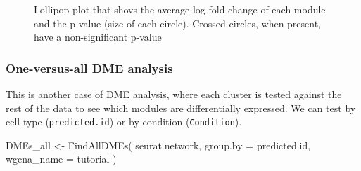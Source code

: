 \documentclass[
  letterpaper,
  DIV=11,
  numbers=noendperiod]{scrartcl}
\newenvironment{Shaded}{}{}
\newcommand{\AttributeTok}[1]{\textcolor[rgb]{0.49,0.56,0.16}{#1}}
\newcommand{\FunctionTok}[1]{\textcolor[rgb]{0.02,0.16,0.49}{#1}}
\newcommand{\NormalTok}[1]{#1}
\newcommand{\OtherTok}[1]{\textcolor[rgb]{0.00,0.44,0.13}{#1}}
\newcommand{\StringTok}[1]{\textcolor[rgb]{0.25,0.44,0.63}{#1}}
\begin{document}
\begin{figure}[H]


\caption{\label{fig-lol}Lollipop plot that shovs the average log-fold
change of each module and the p-value (size of each circle). Crossed
circles, when present, have a non-significant p-value}

\end{figure}%

\subsubsection{One-versus-all DME
analysis}\label{one-versus-all-dme-analysis}

This is another case of DME analysis, where each cluster is tested
against the rest of the data to see which modules are differentially
expressed. We can test by cell type (\texttt{predicted.id}) or by
condition (\texttt{Condition}).

\begin{Shaded}
\begin{Highlighting}[]
\NormalTok{DMEs\_all }\OtherTok{\textless{}{-}} \FunctionTok{FindAllDMEs}\NormalTok{(}
\NormalTok{  seurat.network,}
  \AttributeTok{group.by =} \StringTok{\textquotesingle{}predicted.id\textquotesingle{}}\NormalTok{,}
  \AttributeTok{wgcna\_name =} \StringTok{\textquotesingle{}tutorial\textquotesingle{}}
\NormalTok{) }
\end{Highlighting}
\end{Shaded}
\end{document}
